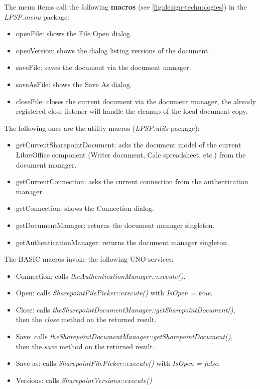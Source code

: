 The menu items call the following \textbf{macros} (see
\autoref{fig:design-technologies}) in the \emph{LPSP.menu} package:

\begin{itemize}
\item openFile: shows the File Open dialog.
\item openVersion: shows the dialog listing versions of the document.
\item saveFile: saves the document via the document manager.
\item saveAsFile: shows the Save As dialog.
\item closeFile: closes the current document via the document manager, the
already registered close listener will handle the cleanup of the local document
copy.
\end{itemize}

The following ones are the utility macros (\emph{LPSP.utils} package):

\begin{itemize}
\item getCurrentSharepointDocument: asks the document model of the current LibreOffice component (Writer document, Calc spreadsheet, etc.) from the document manager.
\item getCurrentConnection: asks the current connection from the authentication manager.
\item getConnection: shows the Connection dialog.
\item getDocumentManager: returns the document manager singleton.
\item getAuthenticationManager: returns the document manager singleton.
\end{itemize}

The BASIC macros invoke the following UNO services:

\begin{itemize}
\item Connection: calls \emph{theAuthenticationManager::execute()}.
\item Open: calls \emph{SharepointFilePicker::execute()} with \emph{IsOpen = true}.
\item Close: calls \emph{theSharepointDocumentManager::getSharepointDocument()}, \\ then the \emph{close} method on the returned result.
\item Save: calls \emph{theSharepointDocumentManager::getSharepointDocument()}, \\ then the \emph{save} method on the returned result.
\item Save as: calls \emph{SharepointFilePicker::execute()} with \emph{IsOpen = false}.
\item Versions: calls \emph{SharepointVersions::execute()}
\end{itemize}


